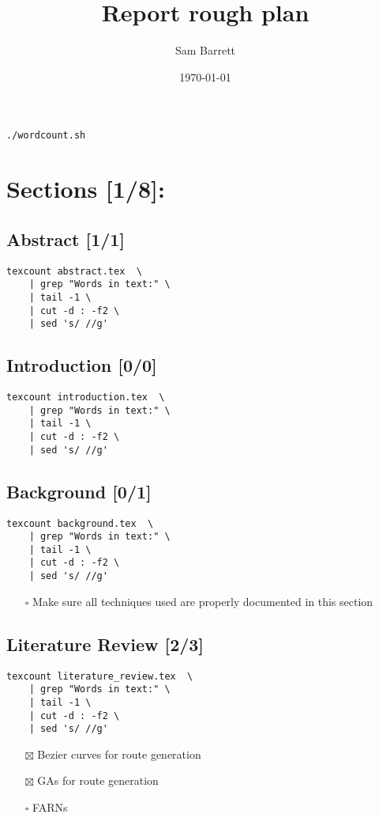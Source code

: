 \documentclass[11pt]{article}
\author{Sam Barrett}
\date{\today}
\title{Report rough plan}
\begin{document}
\maketitle
\tableofcontents

\begin{verbatim}
./wordcount.sh
\end{verbatim}

\section{Sections [1/8]:}
\label{sec:org5e89f50}
\subsection{{\bfseries\sffamily [ ]} Abstract [1/1]}
\label{sec:org34e45e3}
\begin{verbatim}
texcount abstract.tex  \
    | grep "Words in text:" \
    | tail -1 \
    | cut -d : -f2 \
    | sed 's/ //g'
\end{verbatim}

\subsection{{\bfseries\sffamily [ ]} Introduction [0/0]}
\label{sec:orga33aeb6}
\begin{verbatim}
texcount introduction.tex  \
    | grep "Words in text:" \
    | tail -1 \
    | cut -d : -f2 \
    | sed 's/ //g'
\end{verbatim}

\subsection{{\bfseries\sffamily [X]} Background [0/1]}
\label{sec:org822eaf5}
\begin{verbatim}
texcount background.tex  \
    | grep "Words in text:" \
    | tail -1 \
    | cut -d : -f2 \
    | sed 's/ //g'
\end{verbatim}
\begin{itemize}
\item[{$\square$}] Make sure all techniques used are properly documented in this section
\end{itemize}

\subsection{{\bfseries\sffamily [-]} Literature Review [2/3]}
\label{sec:orgc1a4069}
\begin{verbatim}
texcount literature_review.tex  \
    | grep "Words in text:" \
    | tail -1 \
    | cut -d : -f2 \
    | sed 's/ //g'
\end{verbatim}
\begin{itemize}
\item[{$\boxtimes$}] Bezier curves for route generation
\item[{$\boxtimes$}] GAs for route generation
\item[{$\square$}] FARNs
\end{itemize}
\end{document}

